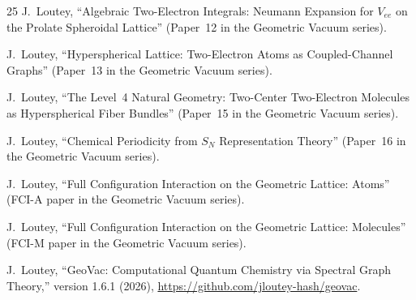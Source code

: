\documentclass[aps,pra,twocolumn,superscriptaddress,longbibliography,floatfix]{revtex4-2}
\begin{document}
\begin{thebibliography}{25}
J.~Loutey,
``Algebraic Two-Electron Integrals: Neumann Expansion
for $V_{ee}$ on the Prolate Spheroidal Lattice''
(Paper~12 in the Geometric Vacuum series).

J.~Loutey,
``Hyperspherical Lattice: Two-Electron Atoms as
Coupled-Channel Graphs''
(Paper~13 in the Geometric Vacuum series).

J.~Loutey,
``The Level~4 Natural Geometry: Two-Center Two-Electron Molecules
as Hyperspherical Fiber Bundles''
(Paper~15 in the Geometric Vacuum series).

J.~Loutey,
``Chemical Periodicity from $S_N$ Representation Theory''
(Paper~16 in the Geometric Vacuum series).

J.~Loutey,
``Full Configuration Interaction on the Geometric Lattice: Atoms''
(FCI-A paper in the Geometric Vacuum series).

J.~Loutey,
``Full Configuration Interaction on the Geometric Lattice: Molecules''
(FCI-M paper in the Geometric Vacuum series).

J.~Loutey,
``GeoVac: Computational Quantum Chemistry via Spectral Graph Theory,''
version 1.6.1 (2026),
\url{https://github.com/jloutey-hash/geovac}.

\end{thebibliography}
\end{document}
